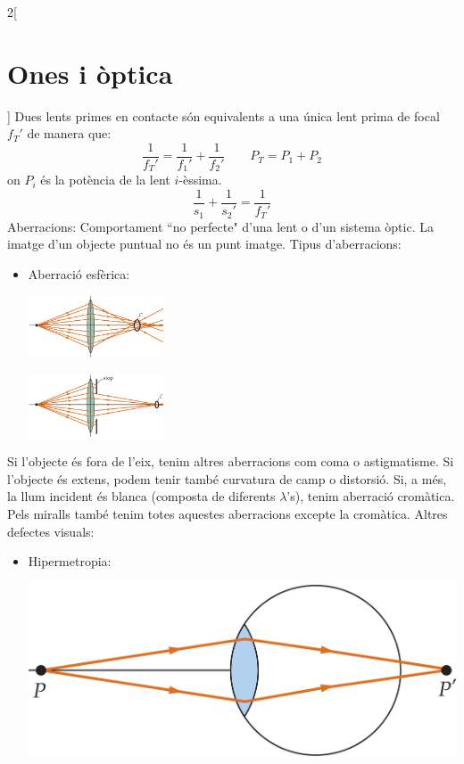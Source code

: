 \documentclass[class=article,10pt,crop=false]{standalone}
\begin{document}
\begin{multicols}{2}[\section{Ones i òptica}]
Dues lents primes en contacte són equivalents a una única lent prima de focal $f_T'$ de manera que: $$\frac{1}{f_T'}=\frac{1}{f_1'}+\frac{1}{f_2'}\qquad P_T=P_1+P_2$$ {\footnotesize on $P_i$ és la potència de la lent $i$-èssima.}
$$\frac{1}{s_1}+\frac{1}{s_2'}=\frac{1}{f_T'}$$
Aberracions: Comportament ``no perfecte" d'una lent o d'un sistema òptic. La imatge d'un objecte puntual no és un punt imatge.
Tipus d'aberracions:
\begin{itemize}
    \item Aberració esfèrica:\newline
    \begin{minipage}{\linewidth}
       \centering \includegraphics[width=4cm]{Physics/1st/Waves_and_optics/Images/aberr1.jpg}
    \end{minipage}
    \begin{minipage}{\linewidth}
       \centering \includegraphics[width=4cm]{Physics/1st/Waves_and_optics/Images/aberr2.jpg} 
    \end{minipage}
\end{itemize} 
    Si l'objecte és fora de l'eix, tenim altres aberracions com coma o astigmatisme.\newline 
    Si l'objecte és extens, podem tenir també curvatura de camp o distorsió.\newline 
Si, a més, la llum incident és blanca (composta de diferents $\lambda$'s), tenim aberració cromàtica.\newline
Pels miralls també tenim totes aquestes aberracions excepte la cro\-mà\-ti\-ca.\newline
Altres defectes visuals:
\begin{itemize}
    \item Hipermetropia:\newline
    \begin{minipage}{\linewidth}
        \includegraphics[width=\linewidth]{Physics/1st/Waves_and_optics/Images/hip.jpg} 

\end{minipage}
\end{itemize}
\end{multicols}
\end{document}

